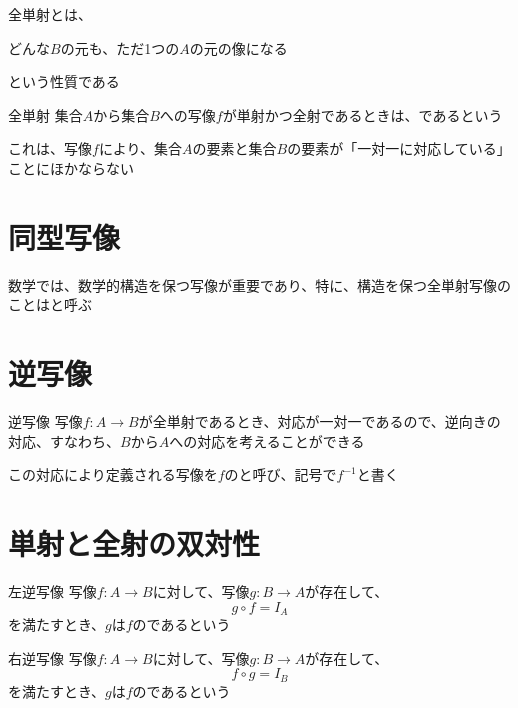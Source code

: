 \documentclass[b5paper,12pt,notitlepage]{jsreport}
\begin{document}
全単射とは、
\begin{shaded}
  どんな$B$の元も、ただ1つの$A$の元の像になる
\end{shaded}
という性質である

\begin{definition}{全単射}
  集合$A$から集合$B$への写像$f$が単射かつ全射であるときは、であるという
\end{definition}

これは、写像$f$により、集合$A$の要素と集合$B$の要素が「一対一に対応している」ことにほかならない

\sectionline
\section{同型写像}

数学では、数学的構造を保つ写像が重要であり、特に、構造を保つ全単射写像のことはと呼ぶ

\sectionline
\section{逆写像}

\begin{definition}{逆写像}
  写像$f\colon A \to B$が全単射であるとき、対応が一対一であるので、逆向きの対応、すなわち、$B$から$A$への対応を考えることができる

  この対応により定義される写像を$f$のと呼び、記号で$f^{-1}$と書く
\end{definition}

\sectionline
\section{単射と全射の双対性}

\begin{definition}{左逆写像}
  写像$f\colon A \to B$に対して、写像$g\colon B \to A$が存在して、
  \begin{equation*}
    g \circ f = I_A
  \end{equation*}
  を満たすとき、$g$は$f$のであるという
\end{definition}

\begin{definition}{右逆写像}
  写像$f\colon A \to B$に対して、写像$g\colon B \to A$が存在して、
  \begin{equation*}
    f \circ g = I_B
  \end{equation*}
  を満たすとき、$g$は$f$のであるという
\end{definition}
\end{document}
